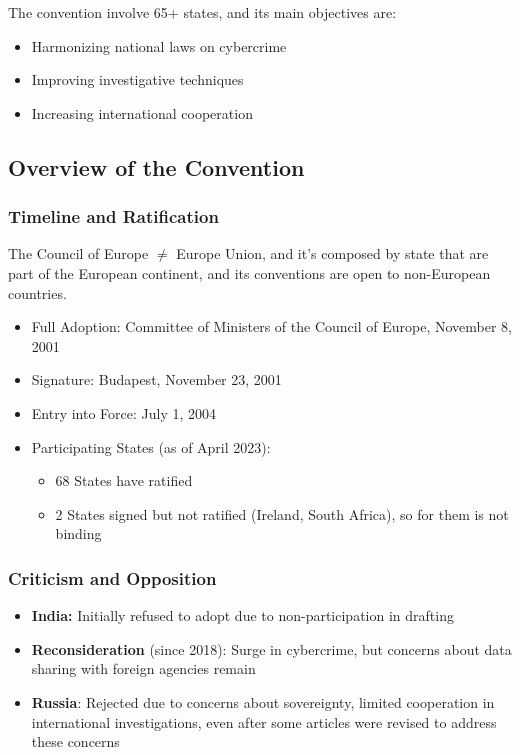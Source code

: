 The convention involve 65+ states, and its main objectives are:
\begin{itemize}[itemsep=0pt]
  \item Harmonizing national laws on cybercrime
  \item Improving investigative techniques
  \item Increasing international cooperation
\end{itemize}

\subsection{Overview of the Convention}

\subsubsection{Timeline and Ratification}

\begin{boxH}
  The Council of Europe $\neq$ Europe Union, and it's composed by state that are part of the European continent, and its conventions are open to non-European countries.
\end{boxH}

\begin{itemize}[itemsep=0pt]
  \item Full Adoption: Committee of Ministers of the Council of Europe, November 8, 2001
  \item Signature: Budapest, November 23, 2001
  \item Entry into Force: July 1, 2004
  \item Participating States (as of April 2023):
    \begin{itemize}[itemsep=0pt]
      \item 68 States have ratified
      \item 2 States signed but not ratified (Ireland, South Africa), so for them is not binding
    \end{itemize}
\end{itemize}

\subsubsection{Criticism and Opposition}
\begin{itemize}[itemsep=0pt]
  \item \textbf{India:} Initially refused to adopt due to non-participation in drafting
  \item \textbf{Reconsideration} (since 2018): Surge in cybercrime, but concerns about data sharing with foreign agencies remain
  \item \textbf{Russia}: Rejected due to concerns about sovereignty, limited cooperation in international investigations, even after some articles were revised to address these concerns
\end{itemize}

